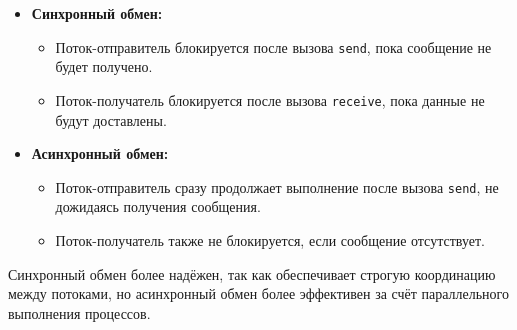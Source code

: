 \documentclass[a4paper, 12pt]{report}
\numberwithin{equation}{section}
\begin{document}
\begin{itemize}
    \item \textbf{Синхронный обмен:} 
    \begin{itemize}
        \item Поток-отправитель блокируется после вызова \texttt{send}, пока сообщение не будет получено.
        \item Поток-получатель блокируется после вызова \texttt{receive}, пока данные не будут доставлены.
    \end{itemize}
    \item \textbf{Асинхронный обмен:} 
    \begin{itemize}
        \item Поток-отправитель сразу продолжает выполнение после вызова \texttt{send}, не дожидаясь получения сообщения.
        \item Поток-получатель также не блокируется, если сообщение отсутствует.
    \end{itemize}
\end{itemize}
Синхронный обмен более надёжен, так как обеспечивает строгую координацию между потоками, но асинхронный обмен более эффективен за счёт параллельного выполнения процессов.
\end{document}
